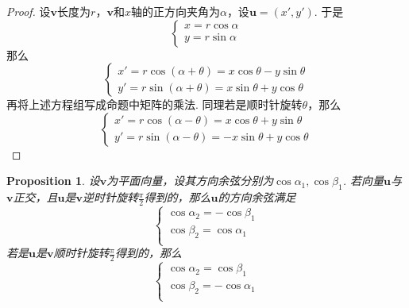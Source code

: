\documentclass{article}
\newcommand{\mbf}[1]{\bm{#1}}
\newtheorem{proposition}[theorem]{Proposition}
\begin{document}
\begin{proof}
\rm 设$\mbf{v}$长度为$r$，$\mbf{v}$和$x$轴的正方向夹角为$\alpha$，设$\mbf{u}=(x',y')$.  于是
$$
\left\{
\begin{array}{ll}
x = r\cos\alpha \\
y = r\sin\alpha
\end{array} \right.
$$
那么
$$
\left\{
\begin{array}{ll}
x' = r\cos(\alpha+\theta) = x\cos\theta - y\sin\theta  \\
y' = r\sin(\alpha+\theta) = x\sin\theta + y\cos\theta
\end{array} \right.
$$
再将上述方程组写成命题中矩阵的乘法. 同理若是顺时针旋转$\theta$，那么
$$
\left\{
\begin{array}{ll}
x' = r\cos(\alpha-\theta) = x\cos\theta + y\sin\theta  \\
y' = r\sin(\alpha-\theta) = -x\sin\theta + y\cos\theta
\end{array} \right.
$$
\end{proof}

\begin{proposition}
\rm 设$\mbf{v}$为平面向量，设其方向余弦分别为$\cos\alpha_1,\cos \beta_1$. 若向量$\mbf{u}$与$\mbf{v}$正交，且$\mbf{u}$是$\mbf{v}$逆时针旋转$\frac{\pi}{2}$得到的，那么$\mbf{u}$的方向余弦满足
$$
\left\{
\begin{array}{ll}
\cos\alpha_2 = -\cos\beta_1\\
\cos\beta_2 = \cos\alpha_1\\
\end{array}\right.
$$
若是$\mbf{u}$是$\mbf{v}$顺时针旋转$\frac{\pi}{2}$得到的，那么
$$
\left\{
\begin{array}{ll}
\cos\alpha_2 = \cos\beta_1 \\
\cos\beta_2 = -\cos\alpha_1 \\
\end{array}\right.
$$
\end{proposition}
\end{document}
